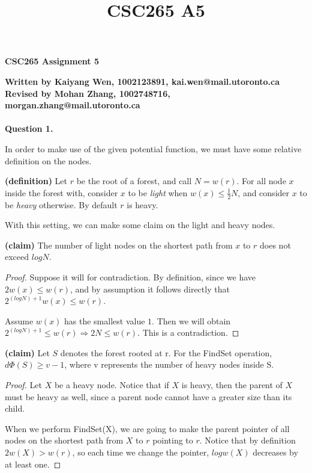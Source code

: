 \documentclass[a4paper, 10pt]{article}
\title{CSC265 A5}
\begin{document}
\begin{center}
{\LARGE \bf CSC265 Assignment 5}\\
\end{center}
\textbf{Written by Kaiyang Wen, 1002123891, kai.wen@mail.utoronto.ca }\\
\textbf{Revised by Mohan Zhang, 1002748716, morgan.zhang@mail.utoronto.ca }\\\\
{\noindent\large\textbf{Question 1.}}

{\setmainfont{Arial}
In order to make use of the given potential function, we must have some relative definition on the nodes.

\noindent\textbf{(definition)} Let $r$ be the root of a forest, and call $N = w(r)$. For all node $x$ inside the forest with, consider $x$ to be \textit{light} when $w(x) \le \frac{1}{2} N$, and consider $x$ to be \textit{heavy} otherwise. By default $r$ is heavy.

With this setting, we can make some claim on the light and heavy nodes.

{\noindent\textbf{(claim)} 
The number of light nodes on the shortest path from $x$ to $r$ does not exceed $log N$.
}
\begin{proof}
Suppose it will for contradiction. By definition, since we have $2w(x) \le w(r)$, and by assumption it follows directly that $2^{(log N)+1}w(x) \le w(r)$.

Assume $w(x)$ has the smallest value $1$. Then we will obtain $2^{(log N)+1} \le w(r) \Rightarrow 2N \le w(r)$. This is a contradiction.
\end{proof}

{\noindent\textbf{(claim)} 
Let $S$ denotes the forest rooted at r. For the FindSet operation, $d\Phi(S) \ge v - 1$, where v represents the number of heavy nodes inside S.
}
\begin{proof}
Let $X$ be a heavy node. Notice that if $X$ is heavy, then the parent of $X$ must be heavy as well, since a parent node cannot have a greater size than its child. 

When we perform FindSet(X), we are going to make the parent pointer of all nodes on the shortest path from $X$ to $r$ pointing to $r$. Notice that by definition $2w(X) > w(r)$, so each time we change the pointer, $log w(X)$ decreases by at least one.


\end{proof}}
\end{document}
